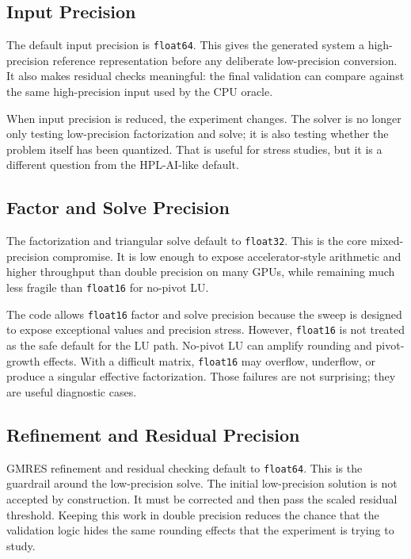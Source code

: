 \documentclass[11pt]{article}
\newcommand{\code}[1]{\texttt{#1}}
\begin{document}
\subsection{Input Precision}

The default input precision is \code{float64}. This gives the generated system
a high-precision reference representation before any deliberate low-precision
conversion. It also makes residual checks meaningful: the final validation can
compare against the same high-precision input used by the CPU oracle.

When input precision is reduced, the experiment changes. The solver is no
longer only testing low-precision factorization and solve; it is also testing
whether the problem itself has been quantized. That is useful for stress
studies, but it is a different question from the HPL-AI-like default.

\subsection{Factor and Solve Precision}

The factorization and triangular solve default to \code{float32}. This is the
core mixed-precision compromise. It is low enough to expose accelerator-style
arithmetic and higher throughput than double precision on many GPUs, while
remaining much less fragile than \code{float16} for no-pivot LU.

The code allows \code{float16} factor and solve precision because the sweep is
designed to expose exceptional values and precision stress. However,
\code{float16} is not treated as the safe default for the LU path. No-pivot LU
can amplify rounding and pivot-growth effects. With a difficult matrix,
\code{float16} may overflow, underflow, or produce a singular effective
factorization. Those failures are not surprising; they are useful diagnostic
cases.

\subsection{Refinement and Residual Precision}

GMRES refinement and residual checking default to \code{float64}. This is the
guardrail around the low-precision solve. The initial low-precision solution is
not accepted by construction. It must be corrected and then pass the scaled
residual threshold. Keeping this work in double precision reduces the chance
that the validation logic hides the same rounding effects that the experiment
is trying to study.
\end{document}
